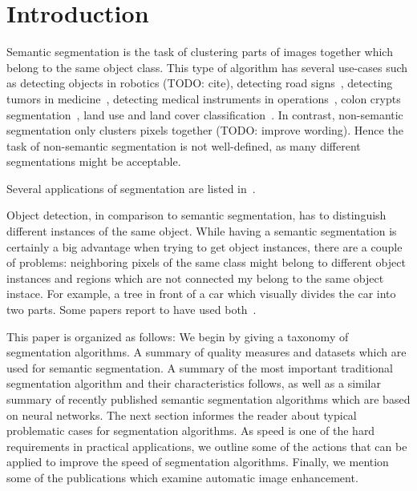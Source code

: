 \section{Introduction}\label{sec:introduction}
Semantic segmentation is the task of clustering parts of images together which
belong to the same object class. This type of algorithm has several use-cases
such as detecting objects in robotics (TODO: cite), detecting road
signs~\cite{4220659}, detecting tumors in medicine~\cite{moon2002automatic},
detecting medical instruments in operations~\cite{wei1997automatic}, colon
crypts segmentation~\cite{cohen2015memory}, land use and land cover
classification~\cite{huang2002assessment}. In contrast, non-semantic
segmentation only clusters pixels together (TODO: improve wording). Hence the
task of non-semantic segmentation is not well-defined, as many different
segmentations might be acceptable.

Several applications of segmentation are listed
in~\cite{annurev.bioeng.2.1.315}.

Object detection, in comparison to semantic segmentation, has to distinguish
different instances of the same object. While having a semantic segmentation is
certainly a big advantage when trying to get object instances, there are a
couple of problems: neighboring pixels of the same class might belong to
different object instances and regions which are not connected my belong to the
same object instace. For example, a tree in front of a car which visually
divides the car into two parts. Some papers report to have used
both~\cite{tighe2014scene}.



This paper is organized as follows: We begin by giving a taxonomy of
segmentation algorithms. %
A summary of quality measures and datasets which are used for semantic
segmentation. A summary of the most important traditional segmentation
algorithm and their characteristics follows, as well as a similar summary of
recently published semantic segmentation algorithms which are based on neural
networks. The next section informes the reader about typical problematic cases
for segmentation algorithms. As speed is one of the hard requirements in
practical applications, we outline some of the actions that can be applied to
improve the speed of segmentation algorithms. Finally, we mention some of the
publications which examine automatic image enhancement.
